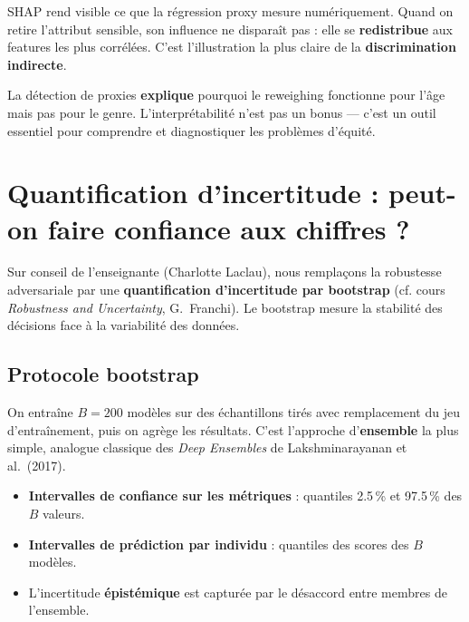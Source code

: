 \documentclass[11pt, a4paper]{article}
\begin{document}
\begin{leconbox}[Le\c{c}on]
SHAP rend visible ce que la r\'{e}gression proxy mesure num\'{e}riquement. Quand on retire l'attribut sensible, son influence ne dispara\^{i}t pas : elle se \textbf{redistribue} aux features les plus corr\'{e}l\'{e}es. C'est l'illustration la plus claire de la \textbf{discrimination indirecte}.
\end{leconbox}

\begin{leconbox}[Le\c{c}on fondamentale]
La d\'{e}tection de proxies \textbf{explique} pourquoi le reweighing fonctionne pour l'\^{a}ge mais pas pour le genre. L'interpr\'{e}tabilit\'{e} n'est pas un bonus --- c'est un outil essentiel pour comprendre et diagnostiquer les probl\`{e}mes d'\'{e}quit\'{e}.
\end{leconbox}

\section{Quantification d'incertitude : peut-on faire confiance aux chiffres ?}
\label{sec:incertitude}

\begin{questionbox}
Sur conseil de l'enseignante (Charlotte Laclau), nous rempla\c{c}ons la robustesse adversariale par une \textbf{quantification d'incertitude par bootstrap} (cf. cours \textit{Robustness and Uncertainty}, G.~Franchi). Le bootstrap mesure la stabilit\'{e} des d\'{e}cisions face \`{a} la variabilit\'{e} des donn\'{e}es.
\end{questionbox}

\subsection{Protocole bootstrap}

On entra\^{i}ne $B = 200$ mod\`{e}les sur des \'{e}chantillons tir\'{e}s avec remplacement du jeu d'entra\^{i}nement, puis on agr\`{e}ge les r\'{e}sultats. C'est l'approche d'\textbf{ensemble} la plus simple, analogue classique des \textit{Deep Ensembles} de Lakshminarayanan et al.\ (2017).

\begin{itemize}
    \item \textbf{Intervalles de confiance sur les m\'{e}triques} : quantiles 2.5\,\% et 97.5\,\% des $B$ valeurs.
    \item \textbf{Intervalles de pr\'{e}diction par individu} : quantiles des scores des $B$ mod\`{e}les.
    \item L'incertitude \textbf{\'{e}pist\'{e}mique} est captur\'{e}e par le d\'{e}saccord entre membres de l'ensemble.
\end{itemize}
\end{document}
